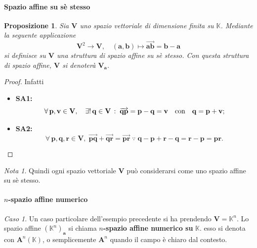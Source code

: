 \documentclass{article}
\theoremstyle{plain}
\newtheorem{prop}[thm]{Proposizione}
\theoremstyle{definition}
\theoremstyle{remark}
\newtheorem{note}{Nota}
\newtheorem{case}{Caso}
\begin{document}
\paragraph{Spazio affine su sè stesso}
\begin{bxthm}
\begin{prop}
    Sia $\mathbf{V}$ uno spazio vettoriale di dimensione finita su $\mathbb{K}$. 
    Mediante la seguente applicazione
    \[\mathbf{V}^2\to\mathbf{V},\quad (\mathbf{a},\mathbf{b})\mapsto\overrightarrow{\mathbf{ab}}=\mathbf{b}-\mathbf{a}\]
    si definisce su $\mathbf{V}$ una struttura di spazio affine su sè stesso. 
    Con questa struttura di spazio affine, $\mathbf{V}$ si denoterà $\mathbf{V}_\mathbf{a}$.
\end{prop}
\end{bxthm}
\begin{proof}
Infatti
\begin{itemize}
    \item \textbf{SA1: } \[\forall\,\mathbf{p},\mathbf{v}\in\mathbf{V},\quad\exists!\,\mathbf{q}\in\mathbf{V}\,:\;\overrightarrow{\mathbf{q}\mathbf{p}}=\mathbf{p}-\mathbf{q}=\mathbf{v}\quad\textup{con}\quad\mathbf{q}=\mathbf{p}+\mathbf{v};\]
    \item \textbf{SA2: } \[\forall\,\mathbf{p},\mathbf{q},\mathbf{r}\in\mathbf{V},\;\overrightarrow{\mathbf{pq}}+\overrightarrow{\mathbf{qr}}=\overrightarrow{\mathbf{pr}}\;\because\;\mathbf{q}-\mathbf{p}+\mathbf{r}-\mathbf{q}=\mathbf{r}-\mathbf{p}=\mathbf{pr}.\]
\end{itemize}
\end{proof}

\vspace{10pt}

\begin{note}
    Quindi ogni spazio vettoriale $\mathbf{V}$ può considerarsi come uno spazio affine su sè stesso.
\end{note}


\vspace{10pt}

\paragraph{$n$-spazio affine numerico}
\begin{case}
    Un caso particolare dell'esempio precedente si ha prendendo $\mathbf{V}=\mathbb{K}^n$. 
    Lo spazio affine $(\mathbb{K}^n)_\mathbf{a}$ si chiama $n$\textbf{-spazio affine numerico su} $\mathbb{K}$. 
    esso si denota con $\mathbf{A}^n(\mathbb{K})$, o semplicemente $\mathbf{A}^n$ quando il campo è chiaro dal contesto.
\end{case}
\end{document}
